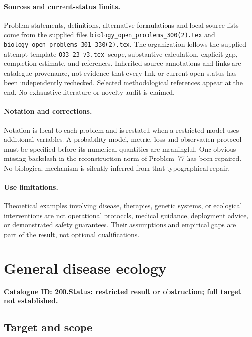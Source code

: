 \documentclass[11pt]{article}
\begin{document}
\paragraph{Sources and current-status limits.}
Problem statements, definitions, alternative formulations and local source lists
come from the supplied files
\texttt{biology\_open\_problems\_300(2).tex} and
\texttt{biology\_open\_problems\_301\_330(2).tex}.
The organization follows the supplied attempt template
\texttt{O33-23\_v3.tex}: scope, substantive calculation, explicit gap,
completion estimate, and references. Inherited source annotations and links are
catalogue provenance, not evidence that every link or current open status has
been independently rechecked. Selected methodological references appear at the
end. No exhaustive literature or novelty audit is claimed.

\paragraph{Notation and corrections.}
Notation is local to each problem and is restated when a restricted model uses
additional variables. A probability model, metric, loss and observation protocol
must be specified before its numerical quantities are meaningful. One obvious
missing backslash in the reconstruction norm of Problem~77 has been repaired.
No biological mechanism is silently inferred from that typographical repair.

\paragraph{Use limitations.}
Theoretical examples involving disease, therapies, genetic systems, or ecological
interventions are not operational protocols, medical guidance, deployment advice,
or demonstrated safety guarantees. Their assumptions and empirical gaps are part
of the result, not optional qualifications.

\setcounter{section}{199}
\section{General disease ecology}
\label{prob:200}
\noindent\textbf{Catalogue ID: 200.}\quad \textbf{Status: restricted result or obstruction; full target not established.}
\subsection{Target and scope}
\end{document}
